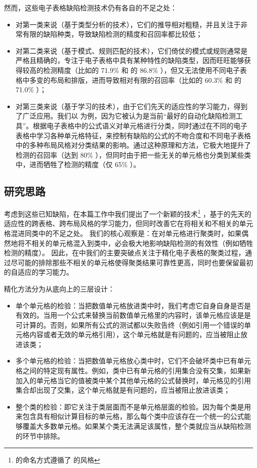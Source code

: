 
然而，这些电子表格缺陷检测技术仍有各自的不足之处：

\begin{itemize}
    \item 对第一类来说（基于类型分析的技术），它们的推导相对粗糙，并且关注于非常有限的缺陷种类，导致缺陷检测的精度和召回率都比较低\cite{zhang2017effectively}；
    \item 对第二类来说（基于模式、规则匹配的技术），它们倚仗的模式或规则通常是严格且精确的，专注于电子表格中具有某种特性的缺陷类型，因而旺旺能够获得较高的检测精度（比如\am 的 71.9\% 和 \ca 的 86.8\% \cite{dou2017cacheck}），但又无法使用不同电子表格中多变的布局和排版，进而导致相对有限的召回率（比如\am 的 60.3\% 和 \ca 的 71.0\% \cite{dou2017cacheck}）；
    \item 对第三类来说（基于学习的技术），由于它们先天的适应性的学习能力，得到了广泛应用。我们以 \cu \cite{cheung2016custodes} 为例，因为它被认为是当前“最好的自动化缺陷检测工具”\cite{Barowy2018excelint}。\cu 根据电子表格中的公式语义对单元格进行分类，同时通过在不同的电子表格中学习各种单元格特征，来控制有缺陷的公式的不吻合度和不同电子表格中的多种布局风格对分类结果的影响。通过这种原理和方法，它极大地提升了检测的召回率（达到 80\% \cite{cheung2016custodes}），但同时由于把一些无关的单元格也分类到某些类中，进而牺牲了检测的精度（仅 65\% \cite{cheung2016custodes}）。
\end{itemize}

\subsection{研究思路}

考虑到这些已知缺陷，在本篇工作中我们提出了一个新颖的技术\wa \footnote{\wa 的命名方式遵循了 \cu 的风格} \cite{li2019warder}，基于\cu 的先天的适应性的跨表格、跨布局风格的学习能力，但同时改善它在将相关和不相关的单元格混进同类中的不足之处。
我们的核心观察是：在对单元格进行聚类时，如果偶然地将不相关的单元格混入到类中，必会极大地影响缺陷检测的有效性（例如牺牲检测的精度）。
因此，在\wa 中我们的主要突破点关注于精化电子表格的聚类过程，通过尽可能的排除那些不相关的单元格使得聚类结果可靠性更高，同时也要保留\cu 最初的自适应的学习能力。

精化方法分为从底向上的三层设计：
\begin{itemize}
    \item 单个单元格的检验：当把数值单元格放进类中时，我们考虑它自身自身是否是有效的。当用一个公式来替换当前数值单元格里的内容时，该单元格应该是是可计算的。否则，如果所有公式的测试都以失败告终（例如引用一个错误的单元格内容或者无效的单元格引用），这个单元格就是有问题的，应当被阻止放进该类；
    \item 多个单元格的检验：当把数值单元格放心类中时，它们不会破坏类中已有单元格之间的特定现有属性。例如，类中已有单元格的引用集合没有交集，如果新加入的单元格当它的值被类中某个其他单元格的公式替换时，单元格见的引用集合却出现了交集，这个单元格就是有问题的，应当被阻止放进该类；
    \item 整个类的检验：即它关注于类层面而不是单元格层面的检验。因为每个类是用来包含具有相似计算目标的单元格，那么每个类中应该存在一个统一的公式能够覆盖大多数单元格。如果某个类无法满足该属性，整个类就应当从缺陷检测的环节中排除。
\end{itemize}

